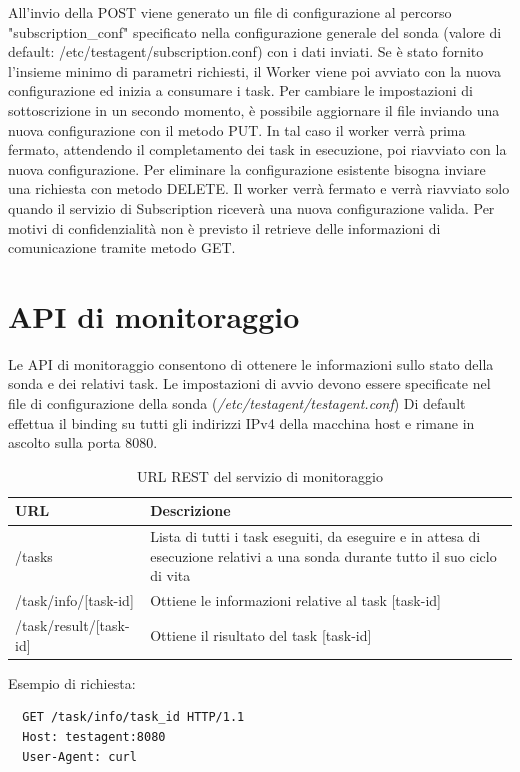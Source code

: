 \documentclass[../main.tex]{subfiles}
\begin{document}
All'invio della POST viene generato un file di configurazione al percorso "subscription\_conf" specificato nella configurazione generale del sonda (valore di default: /etc/testagent/subscription.conf) con i dati inviati.
Se è stato fornito l'insieme minimo di parametri richiesti, il Worker viene poi avviato con la nuova configurazione ed inizia a consumare i task.
Per cambiare le impostazioni di sottoscrizione in un secondo momento, è possibile aggiornare il file inviando una nuova configurazione con il metodo PUT.
In tal caso il worker verrà prima fermato, attendendo il completamento dei task in esecuzione, poi riavviato con la nuova configurazione.
Per eliminare la configurazione esistente bisogna inviare una richiesta con metodo DELETE.
Il worker verrà fermato e verrà riavviato solo quando il servizio di Subscription riceverà una nuova configurazione valida.
Per motivi di confidenzialità non è previsto il retrieve delle informazioni di comunicazione tramite metodo GET.
\section{API di monitoraggio}
Le API di monitoraggio consentono di ottenere le informazioni sullo stato della sonda e dei relativi task.
Le impostazioni di avvio devono essere specificate nel file di configurazione della sonda (\textit{/etc/testagent/testagent.conf})
Di default effettua il binding su tutti gli indirizzi IPv4 della macchina host e rimane in ascolto sulla porta 8080.
\begin{table}[h]
\centering
\begin{tabular}{| m{4.4cm}| m{9cm} | }
\hline
\textbf{URL} & \textbf{Descrizione} \\ \hline
/tasks & Lista di tutti i task eseguiti, da eseguire e in attesa di esecuzione relativi a una sonda durante tutto il suo ciclo di vita \\ \hline 
/task/info/[task-id] & Ottiene le informazioni relative al task [task-id]\\ \hline
/task/result/[task-id] & Ottiene il risultato del task [task-id]\\ \hline
\end{tabular}
\caption{URL REST del servizio di monitoraggio}
\label{tab:monitoring urls}
\end{table}

Esempio di richiesta:
\begin{Verbatim}
  GET /task/info/task_id HTTP/1.1
  Host: testagent:8080
  User-Agent: curl
\end{Verbatim}
\end{document}
